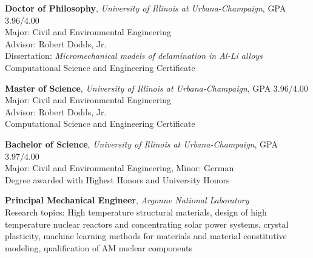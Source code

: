 \usepackage{ifthen}
\usepackage[sorting=ydnt,style=numeric,defernumbers]{biblatex}










\makecvtitle


\textbf{Doctor of Philosophy}, \emph{University of Illinois at Urbana-Champaign},
GPA 3.96/4.00\\
Major: Civil and Environmental Engineering\\
Advisor: Robert Dodds, Jr. \\
Dissertation: \textit{Micromechanical models of delamination in Al-Li
alloys}\\
Computational Science and Engineering Certificate

\textbf{Master of Science}, \emph{University of Illinois at Urbana-Champaign},
GPA 3.96/4.00 \\
Major: Civil and Environmental Engineering\\
Advisor: Robert Dodds, Jr. \\
Computational Science and Engineering Certificate

\textbf{Bachelor of Science}, \emph{University of Illinois at Urbana-Champaign},
GPA 3.97/4.00 \\
Major: Civil and Environmental Engineering, Minor: German\\
Degree awarded with Highest Honors and University Honors 


\textbf{Principal Mechanical Engineer}, \emph{Argonne National Laboratory}
\\
Research topics: High temperature structural materials, design
of high temperature nuclear reactors and concentrating solar power systems,
crystal plasticity, machine learning
methods for materials and material constitutive modeling,
qualification of AM nuclear components

